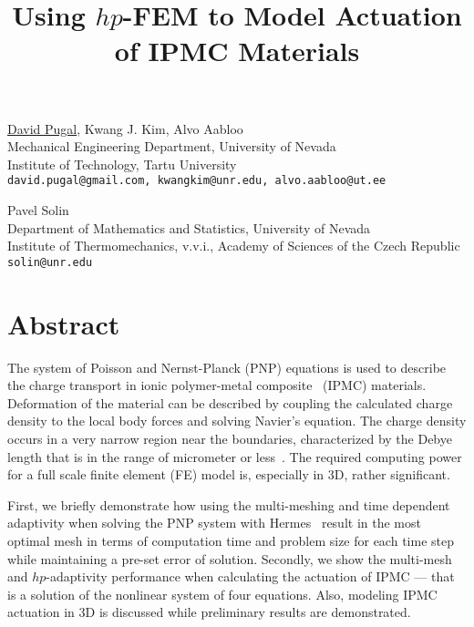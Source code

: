 \title{Using $hp$-FEM to Model Actuation of IPMC Materials}
\author{} \institute{}
\maketitle

\begin{center}
{\large \underline{David Pugal}, Kwang J. Kim, Alvo Aabloo}\\
Mechanical Engineering Department, University of Nevada\\
Institute of Technology, Tartu University\\
{\tt david.pugal@gmail.com, kwangkim@unr.edu, alvo.aabloo@ut.ee}\\
\vspace{4mm}

{\large Pavel Solin}\\
Department of Mathematics and Statistics, University of Nevada\\
Institute of Thermomechanics, v.v.i., Academy of Sciences of the Czech Republic\\
{\tt solin@unr.edu}
\end{center}

\section*{Abstract}
The system of Poisson and Nernst-Planck (PNP) equations is used to describe the charge transport in ionic polymer-metal composite~\cite{shahinpoor2001} (IPMC) materials. Deformation of the material can be described by coupling the calculated charge density to the local body forces and solving Navier's equation. The charge density occurs in a very narrow region near the boundaries, characterized by the Debye length that is in the range of micrometer or less~\cite{bazant2004diffuse}. The required computing power for a full scale finite element (FE) model is, especially in 3D, rather significant.
  
First, we briefly demonstrate how using the multi-meshing and time dependent adaptivity when solving the PNP system with Hermes~\cite{Hermes-project} result in the most optimal mesh in terms of computation time and problem size for each time step while maintaining a pre-set error of solution. Secondly, we show the multi-mesh and $hp$-adaptivity performance when calculating the actuation of IPMC --- that is a solution of the nonlinear system of four equations. Also, modeling IPMC actuation in 3D is discussed while preliminary results are demonstrated.


